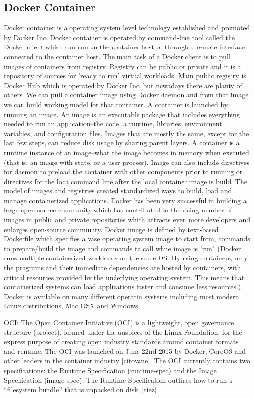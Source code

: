 \begin{enumerate}
\section{Docker Container}
Docker container is a operating system level technology established  and promoted by Docker Inc. Docker container is operated by command-line tool called the Docker client which can run on the container host or through a remote interface connected to the container host. The main task of a Docker client is to pull images of containers from registry. Registry can be public or private and it is a repository of sources for 'ready to run' virtual workloads. Main public registry is Docker Hub which is operated by Docker Inc. but nowadays there are planty of others. We can pull a container image using Docker daemon and from that image we can build working model for that container. A container is launched by running an image. An image is an executable package that includes everything needed to run an application–the code, a runtime, libraries, environment variables, and configuration files. Images that are mostly the same, except for the last few steps, can reduce disk usage by sharing parent layers. A container is a runtime instance of an image–what the image becomes in memory when executed (that is, an image with state, or a user process). Image can also include directives for daemon to preload the container with other components prior to running or directives for the loca command line after the local container image is build. The model of images and registries created standardized ways to build, load and manage containerized applications. Docker has been very successful in building a large open-source community which has contributed to the rising number of images in public and private repositories which attracts even more developers and enlarges open-source community. Docker image is defined by text-based Dockerfile which specifies a vase operating system image to start from, commands to prepare/build the image and commands to call whne image is 'run'. (Docker runs multiple containerized workloads on the same OS. By using containers, only the programs and their immediate dependencies are hosted by containers, with critical resources provided by the underlying operating system.  This means that containerized systems can load applications faster and consume less resources.). Docker is available on many different operatin systems including most modern Linux distributions, Mac OSX and Windows.

OCI: The Open Container Initiative (OCI) is a lightweight, open governance structure (project), formed under the auspices of the Linux Foundation, for the express purpose of creating open industry standards around container formats and runtime. The OCI was launched on June 22nd 2015 by Docker, CoreOS and other leaders in the container industry [citovane]. The OCI currently contains two specifications: the Runtime Specification (runtime-spec) and the Image Specification (image-spec). The Runtime Specification outlines how to run a “filesystem bundle” that is unpacked on disk. [tiez]


\end{enumerate}
